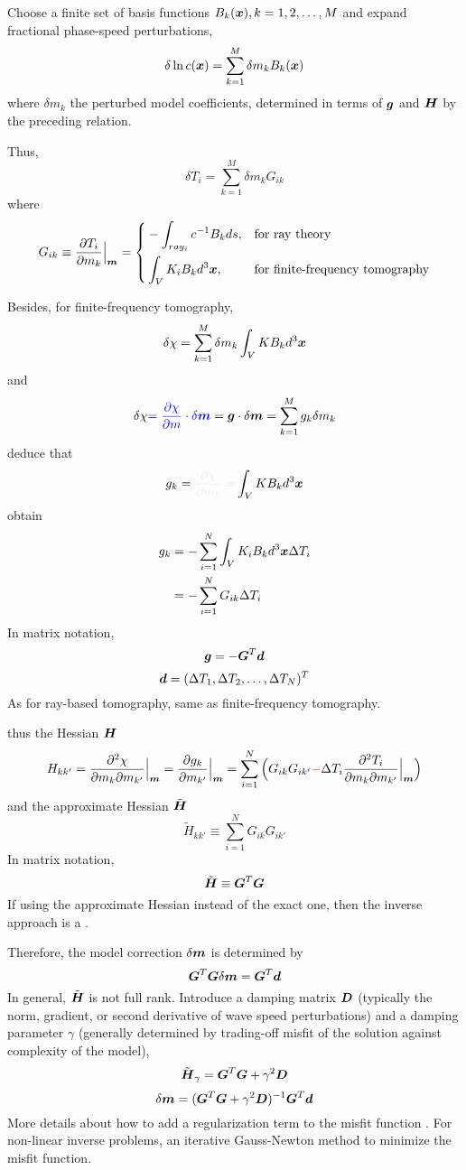 Choose a finite set of basis functions $B_k(\boldsymbol{x}),k=1,2,\ldots,M$
and expand fractional phase-speed perturbations,
\[ \delta\ln c(\boldsymbol{x})=\sum_{k=1}^M\delta m_kB_k(\boldsymbol{x}) \]
where $\delta m_k$ the perturbed model coefficients,
determined in terms of $\boldsymbol{g}$ and $\boldsymbol{H}$ by the preceding relation.

Thus,
\[ \delta T_i=\sum_{k=1}^M\delta m_kG_{ik} \]
where
\begin{equation*}
  G_{ik}\equiv\frac{\partial T_i}{\partial m_k}\Big|_{\boldsymbol{m}}=\left\{
  \begin{aligned}
    & -\int_{ray_i}c^{-1}B_kds, & & \text{for ray theory} \\
    & \int_VK_iB_kd^3\boldsymbol{x}, & & \text{for finite-frequency tomography}
  \end{aligned} \right.
\end{equation*}

Besides, for finite-frequency tomography,
\[ \delta\chi=\sum_{k=1}^M\delta m_k\int_VKB_kd^3\boldsymbol{x} \]
and
\[ \delta\chi{\color{blue}=\frac{\partial\chi}{\partial m}\cdot\delta\boldsymbol{m}}=\boldsymbol{g}\cdot\delta\boldsymbol{m}=\sum_{k=1}^Mg_k\delta m_k \]
deduce that
\[ g_k=\myde{\frac{\partial\chi}{\partial m_k}=}\int_VKB_kd^3\mbf x \]
obtain
\begin{align*}
  g_k & =-\sum_{i=1}^N\int_VK_iB_kd^3\boldsymbol{x}\Delta T_i \\
  & =-\sum_{i=1}^NG_{ik}\Delta T_i
\end{align*}
In matrix notation,
\[ \boldsymbol{g}=-\boldsymbol{G}^T\boldsymbol{d} \]
\[ \boldsymbol{d}=(\Delta T_1,\Delta T_2,\ldots,\Delta T_N)^T \]
As for ray-based tomography, same as finite-frequency tomography.

thus the Hessian $\boldsymbol{H}$
\[ H_{kk'}=\frac{\partial^2\chi}{\partial m_k\partial m_{k'}}\Big|_{\boldsymbol{m}}=\frac{\partial g_k}{\partial m_{k'}}\Big|_{\boldsymbol{m}}=\sum_{i=1}^N\Big(G_{ik}G_{ik'}{\color{red}-}\Delta T_i\frac{\partial^2T_i}{\partial m_k\partial m_{k'}}\Big|_{\boldsymbol{m}}\Big) \]
and the approximate Hessian $\tilde{\boldsymbol{H}}$
\[ \tilde H_{kk'}\equiv\sum_{i=1}^NG_{ik}G_{ik'} \]
In matrix notation,
\[ \tilde{\boldsymbol{H}}\equiv\boldsymbol{G}^T\boldsymbol{G} \]
If using the approximate Hessian instead of the exact one,
then the inverse approach is a .

Therefore, the model correction $\delta\boldsymbol{m}$ is determined by
\[ \boldsymbol{G}^T\boldsymbol{G}\delta\boldsymbol{m}=\boldsymbol{G}^T\boldsymbol{d} \]
In general, $\tilde{\boldsymbol{H}}$ is not full rank.
Introduce a damping matrix $\boldsymbol{D}$
(typically the norm, gradient, or second derivative of wave speed perturbations)
and a damping parameter $\gamma$
(generally determined by trading-off misfit of the solution against complexity of the model),
\[ \tilde{\boldsymbol{H}}_\gamma=\boldsymbol{G}^T\boldsymbol{G}+\gamma^2\boldsymbol{D} \]
\[ \delta\boldsymbol{m}=(\boldsymbol{G}^T\boldsymbol{G}+\gamma^2\boldsymbol{D})^{-1}\boldsymbol{G}^T\boldsymbol{d} \]
More details about how to add a regularization term to the misfit function
.
For non-linear inverse problems, an iterative Gauss-Newton method to minimize the misfit function.

